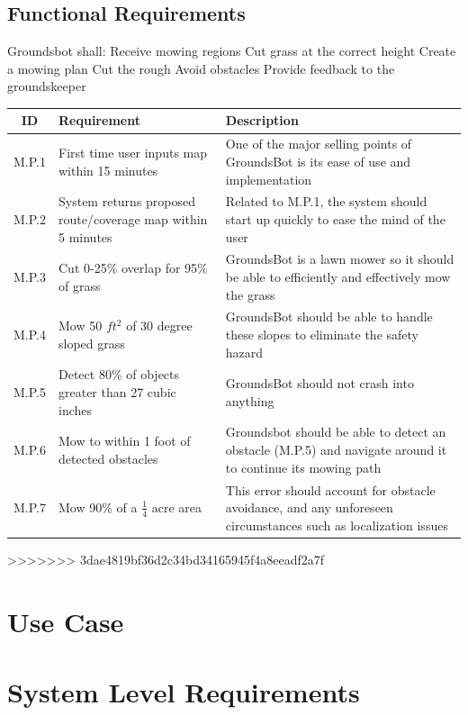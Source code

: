 \documentclass{article}
\begin{document}
\subsection{Functional Requirements}
Groundsbot shall:
  Receive mowing regions
  Cut grass at the correct height
  Create a mowing plan
  Cut the rough 
  Avoid obstacles
  Provide feedback to the groundskeeper
\begin{center}
\begin{tabularx}{\textwidth}{ |c|X|X| }
  \hline
    ID & Requirement & Description \\
  \hline
    M.P.1 &
    First time user inputs map within 15 minutes &
    One of the major selling points of GroundsBot is its ease of use and implementation \\
  \hline
    M.P.2 &
    System returns proposed route/coverage map within 5 minutes &
    Related to M.P.1, the system should start up quickly to ease the mind of the user \\
  \hline
    M.P.3 &
    Cut 0-25\% overlap for 95\% of grass &
    GroundsBot is a lawn mower so it should be able to efficiently and effectively mow the grass \\
  \hline
  	M.P.4 &
  	Mow 50 $ft^2$ of 30 degree sloped grass &
  	GroundsBot should be able to handle these slopes to eliminate the safety hazard \\
  \hline
  	M.P.5 &
  	Detect 80\% of objects greater than 27 cubic inches &
  	GroundsBot should not crash into anything \\
  \hline
  	M.P.6 &
  	Mow to within 1 foot of detected obstacles &
  	Groundsbot should be able to detect an obstacle (M.P.5) and navigate around it to continue its mowing path \\
  \hline
  	M.P.7 &
  	Mow 90\% of a $\frac{1}{4}$ acre area &
  	This error should account for obstacle avoidance, and any unforeseen circumstances such as localization issues \\
  \hline
\end{tabularx}
\end{center}
>>>>>>> 3dae4819bf36d2c34bd34165945f4a8eeadf2a7f


\section{Use Case}

\section{System Level Requirements}
\end{document}
